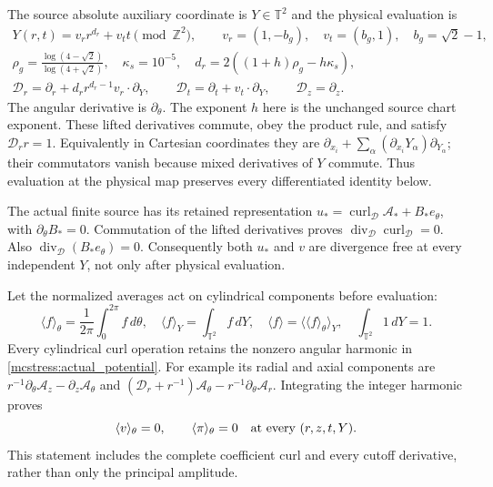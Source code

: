 \documentclass[11pt]{article}
\begin{document}
The source absolute auxiliary coordinate is $Y\in\mathbb T^2$ and
the physical evaluation is
\begin{equation}\label{mcstress:extended_derivatives}
\begin{gathered}
 Y(r,t)=v_r r^{d_r}+v_t t\pmod{\mathbb Z^2},\qquad
 v_r=(1,-b_g),\quad v_t=(b_g,1),\quad b_g=\sqrt2-1,\\
 \rho_g=\frac{\log(4-\sqrt2)}{\log(4+\sqrt2)},\quad
 \kappa_s=10^{-5},\quad d_r=2((1+h)\rho_g-h\kappa_s),\\
 \mathscr D_r=\partial_r+d_r r^{d_r-1}v_r\cdot\partial_Y,
 \qquad \mathscr D_t=\partial_t+v_t\cdot\partial_Y,
 \qquad \mathscr D_z=\partial_z.
\end{gathered}
\end{equation}
The angular derivative is $\partial_\theta$.
The exponent $h$ here is the unchanged source chart exponent. These
lifted derivatives commute, obey the product rule, and satisfy
$\mathscr D_r r=1$. Equivalently in Cartesian coordinates they are
$\partial_{x_i}+\sum_\alpha(\partial_{x_i}Y_\alpha)\partial_{Y_\alpha}$;
their commutators vanish because mixed derivatives of $Y$ commute.
Thus evaluation at the physical map preserves every differentiated
identity below.

The actual finite source has its retained representation
$u_* =\operatorname{curl}_{\mathscr D}\mathcal A_*+B_*e_\theta$,
with $\partial_\theta B_*=0$. Commutation of the lifted derivatives
proves $\operatorname{div}_{\mathscr D}\operatorname{curl}_{\mathscr D}=0$.
Also $\operatorname{div}_{\mathscr D}(B_*e_\theta)=0$.
Consequently both $u_*$ and $v$ are divergence free at every independent
$Y$, not only after physical evaluation.

Let the normalized averages act on cylindrical components before
evaluation:
\[
 \langle f\rangle_\theta=\frac1{2\pi}\int_0^{2\pi}f\,d\theta,
 \quad \langle f\rangle_Y=\int_{\mathbb T^2}f\,dY,
 \quad \langle f\rangle=\langle\langle f\rangle_\theta\rangle_Y,
 \quad\int_{\mathbb T^2}1\,dY=1.
\]
Every cylindrical curl operation retains the nonzero angular harmonic
in \eqref{mcstress:actual_potential}. For example its radial and axial
components are $r^{-1}\partial_\theta\mathcal A_z-\partial_z\mathcal A_\theta$
and $(\mathscr D_r+r^{-1})\mathcal A_\theta-r^{-1}\partial_\theta\mathcal A_r$.
Integrating the integer harmonic proves
\begin{equation}\label{mcstress:zero_mean}
 \langle v\rangle_\theta=0,\qquad
 \langle\pi\rangle_\theta=0
 \quad\hbox{at every }(r,z,t,Y).
\end{equation}
This statement includes the complete coefficient curl and every cutoff
derivative, rather than only the principal amplitude.
\end{document}
